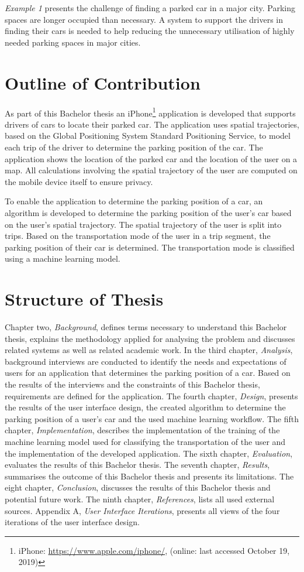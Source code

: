\textit{Example 1} presents the challenge of finding a parked car in a major city. Parking spaces are longer occupied than necessary. A system to support the drivers in finding their cars is needed to help reducing the unnecessary utilisation of highly needed parking spaces in major cities.

\section{Outline of Contribution}
As part of this Bachelor thesis an iPhone\footnote{iPhone: \url{https://www.apple.com/iphone/}, (online: last accessed October 19, 2019)} application is developed that supports drivers of cars to locate their parked car. The application uses spatial trajectories, based on the Global Positioning System Standard Positioning Service, to model each trip of the driver to determine the parking position of the car. The application shows the location of the parked car and the location of the user on a map. All calculations involving the spatial trajectory of the user are computed on the mobile device itself to ensure privacy.

To enable the application to determine the parking position of a car, an algorithm is developed to determine the parking position of the user's car based on the user's spatial trajectory. The spatial trajectory of the user is split into trips. Based on the transportation mode of the user in a trip segment, the parking position of their car is determined. The transportation mode is classified using a machine learning model. 

\section{Structure of Thesis}

Chapter two, \textit{Background}, defines terms necessary to understand this Bachelor thesis, explains the methodology applied for analysing the problem and discusses related systems as well as related academic work.
In the third chapter, \textit{Analysis}, background interviews are conducted to identify the needs and expectations of users for an application that determines the parking position of a car. Based on the results of the interviews and the constraints of this Bachelor thesis, requirements are defined for the application.
The fourth chapter, \textit{Design}, presents the results of the user interface design, the created algorithm to determine the parking position of a user's car and the used machine learning workflow.
The fifth chapter, \textit{Implementation}, describes the implementation of the training of the machine learning model used for classifying the transportation of the user and the implementation of the developed application. 
The sixth chapter, \textit{Evaluation}, evaluates the results of this Bachelor thesis.
The seventh chapter, \textit{Results}, summarises the outcome of this Bachelor thesis and presents its limitations. 
The eight chapter, \textit{Conclusion}, discusses the results of this Bachelor thesis and potential future work.
The ninth chapter, \textit{References}, lists all used external sources. 
Appendix A, \textit{User Interface Iterations}, presents all views of the four iterations of the user interface design.